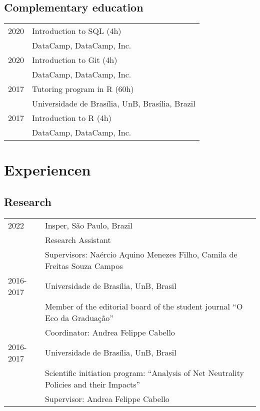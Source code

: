 \documentclass[11pt]{article}
\begin{document}
\subsection*{Complementary education}
\label{sec:org46391f2}
\begin{footnotesize}
  \begin{tabular}{ll}
    2020 & Introduction to SQL (4h)\\
	 & DataCamp, DataCamp, Inc.\\
    2020 & Introduction to Git (4h)\\
	 & DataCamp, DataCamp, Inc.\\
    2017 & Tutoring program in R (60h)\\
	 & Universidade de Brasília, UnB, Brasília, Brazil\\
    2017 & Introduction to R (4h)\\
	 & DataCamp, DataCamp, Inc.
  \end{tabular}
\end{footnotesize}

\section*{Experiencen}
\label{sec:orgc33dbb6}
\subsection*{Research}
\label{sec:org756c06f}
\begin{footnotesize}
  \begin{tabular}{ll}
    2022      & Insper, São Paulo, Brazil\\
	      & Research Assistant\\
	      & Supervisors: Naércio Aquino Menezes Filho, Camila de Freitas Souza Campos\\
    2016-2017 & Universidade de Brasília, UnB, Brasil\\
	      & Member of the editorial board of the student journal ``O Eco da Graduação''\\
	      & Coordinator: Andrea Felippe Cabello\\
    2016-2017 & Universidade de Brasília, UnB, Brasil\\
	      & Scientific initiation program: ``Analysis of Net Neutrality Policies and their Impacts''\\
	      & Supervisor: Andrea Felippe Cabello
  \end{tabular}
\end{footnotesize}
\end{document}
